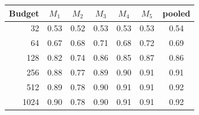 \begin{tabular}{rcccccc}
\toprule
Budget & $M_1$ & $M_2$ & $M_3$ & $M_4$ & $M_5$ & pooled \\
\midrule
32 & 0.53 & 0.52 & 0.53 & 0.53 & 0.53 & 0.54 \\
64 & 0.67 & 0.68 & 0.71 & 0.68 & 0.72 & 0.69 \\
128 & 0.82 & 0.74 & 0.86 & 0.85 & 0.87 & 0.86 \\
256 & 0.88 & 0.77 & 0.89 & 0.90 & 0.91 & 0.91 \\
512 & 0.89 & 0.78 & 0.90 & 0.91 & 0.91 & 0.92 \\
1024 & 0.90 & 0.78 & 0.90 & 0.91 & 0.91 & 0.92 \\
\bottomrule
\end{tabular}
